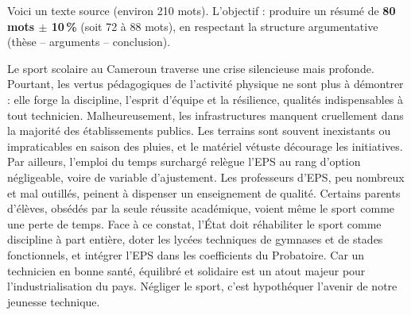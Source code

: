 \documentclass[11pt]{article}
\begin{document}
Voici un texte source (environ 210 mots). L'objectif : produire un résumé de \textbf{80 mots $\pm$ 10\,\%} (soit 72 à 88 mots), en respectant la structure argumentative (thèse -- arguments -- conclusion).

\begin{exemplebox}
Le sport scolaire au Cameroun traverse une crise silencieuse mais profonde. Pourtant, les vertus pédagogiques de l'activité physique ne sont plus à démontrer : elle forge la discipline, l'esprit d'équipe et la résilience, qualités indispensables à tout technicien. Malheureusement, les infrastructures manquent cruellement dans la majorité des établissements publics. Les terrains sont souvent inexistants ou impraticables en saison des pluies, et le matériel vétuste décourage les initiatives. Par ailleurs, l'emploi du temps surchargé relègue l'EPS au rang d'option négligeable, voire de variable d'ajustement. Les professeurs d'EPS, peu nombreux et mal outillés, peinent à dispenser un enseignement de qualité. Certains parents d'élèves, obsédés par la seule réussite académique, voient même le sport comme une perte de temps. Face à ce constat, l'État doit réhabiliter le sport comme discipline à part entière, doter les lycées techniques de gymnases et de stades fonctionnels, et intégrer l'EPS dans les coefficients du Probatoire. Car un technicien en bonne santé, équilibré et solidaire est un atout majeur pour l'industrialisation du pays. Négliger le sport, c'est hypothéquer l'avenir de notre jeunesse technique.
\end{exemplebox}
\end{document}

